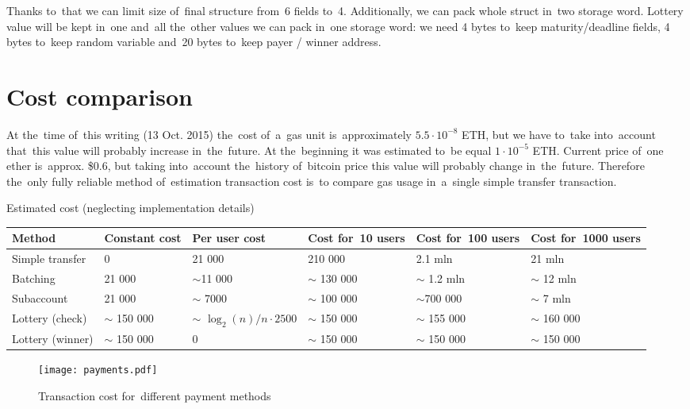 \documentclass[a4paper]{article}
\begin{document}
        Thanks to~that we can limit size of~final structure from~6 fields to~4.  Additionally, we can pack whole struct
        in~two storage word. Lottery value will be kept in~one and~all the~other values we can pack in~one storage
        word: we need 4 bytes to~keep maturity/deadline fields, 4 bytes to~keep random variable and~20 bytes to~keep
        payer / winner address.

\section{Cost comparison}
\label{sec:cost}
    At the~time of~this writing (13 Oct. 2015) the~cost of~a~gas unit is~approximately  $5.5 \cdot 10^{-8}$ ETH, but
    we have to~take into~account that~this value will probably increase in~the~future. At the~beginning it was
    estimated to~be equal $1 \cdot 10^{-5}$ ETH. Current price of~one ether is~approx. \$0.6, but taking into~account
    the~history of~bitcoin price this value will probably change in~the~future. Therefore the~only fully reliable
    method of~estimation transaction cost is~to compare gas usage in~a~single simple transfer transaction.

    Estimated cost (neglecting implementation details)

    \begin{tabular}{|p{8em}|p{5em}|p{8em}|p{5em}|p{5em}|p{5em}|}
        \hline
        Method & Constant cost & Per user cost & Cost for~10 users & Cost for~100 users & Cost for~1000 users \\ \hline
        Simple transfer & 0 & 21 000 & 210 000 & 2.1 mln & 21 mln \\ \hline
        Batching & 21 000 & $\sim$11 000 & $\sim$ 130 000 & $\sim$ 1.2 mln & $\sim$ 12 mln \\ \hline
        Subaccount & 21 000 & $\sim$ 7000 & $\sim$ 100 000 & $\sim$700 000 & $\sim$ 7 mln \\ \hline
        Lottery (check) & $\sim$ 150 000 & $\sim$ $\log_2(n)/n \cdot 2500 $ & $\sim$ 150 000 & $\sim$ 155 000 &
        $\sim$ 160 000 \\ \hline
        Lottery (winner) & $\sim$ 150 000 & 0 & $\sim$ 150 000 & $\sim$ 150 000 & $\sim$ 150 000 \\ \hline
    \end{tabular}

    \begin{figure}
        \centering
        \texttt{[image: payments.pdf]}
        \caption{Transaction cost for~different payment methods}
        \label{fig:payment}
    \end{figure}
\end{document}
